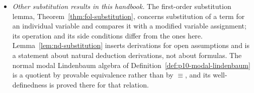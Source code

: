 \begin{itemize}
        identically true checks each axiom schema by assigning truth values
        directly to the schematic parts \(A,B,C\), and then transfers the
        result to every instance \cite[\S 28, Lemma~12a, p.~128]{Kleene1952}.
        That transfer is the validity clause of
        Theorem~\ref{thm:p02-uniform-substitution}.
  \item \emph{Other substitution results in this handbook.}  The first-order
        substitution lemma, Theorem~\ref{thm:fol-substitution}, concerns
        substitution of a term for an individual variable and compares it with
        a modified variable assignment; its operation and its side conditions
        differ from the ones here.  Lemma~\ref{lem:nd-substitution} inserts
        derivations for open assumptions and is a statement about natural
        deduction derivations, not about formulas.  The normal modal
        Lindenbaum algebra of Definition~\ref{def:p10-modal-lindenbaum} is a
        quotient by provable equivalence rather than by \(\equiv\), and its
        well-definedness is proved there for that relation.
\end{itemize}
